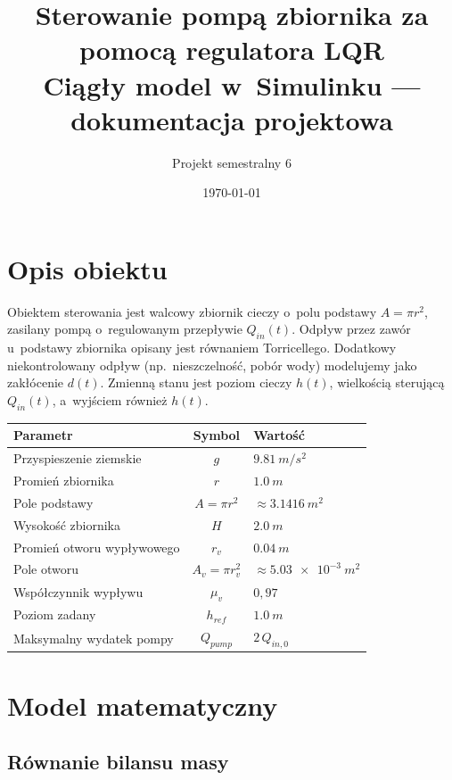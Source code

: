 \documentclass[11pt,a4paper]{article}
\title{\textbf{Sterowanie pompą zbiornika za pomocą regulatora LQR}\\
       \large Ciągły model w~Simulinku --- dokumentacja projektowa}
\author{Projekt semestralny 6}
\date{\today}
\begin{document}
\maketitle

\section{Opis obiektu}

Obiektem sterowania jest walcowy zbiornik cieczy o~polu podstawy
$A = \pi r^2$, zasilany pompą o~regulowanym przepływie $Q_{in}(t)$.
Odpływ przez zawór u~podstawy zbiornika opisany jest równaniem Torricellego.
Dodatkowy niekontrolowany odpływ (np.\ nieszczelność, pobór wody) modelujemy
jako zakłócenie $d(t)$. Zmienną stanu jest poziom cieczy $h(t)$, wielkością
sterującą $Q_{in}(t)$, a~wyjściem również $h(t)$.

\begin{center}
\begin{tabular}{@{}lcl@{}}
\toprule
Parametr & Symbol & Wartość \\
\midrule
Przyspieszenie ziemskie   & $g$      & $\SI{9.81}{m/s^2}$ \\
Promień zbiornika         & $r$      & $\SI{1.0}{m}$ \\
Pole podstawy             & $A=\pi r^2$ & $\approx \SI{3.1416}{m^2}$ \\
Wysokość zbiornika        & $H$      & $\SI{2.0}{m}$ \\
Promień otworu wypływowego& $r_v$    & $\SI{0.04}{m}$ \\
Pole otworu               & $A_v=\pi r_v^2$ & $\approx \SI{5.03e-3}{m^2}$ \\
Współczynnik wypływu      & $\mu_v$  & $0{,}97$ \\
Poziom zadany             & $h_{ref}$& $\SI{1.0}{m}$ \\
Maksymalny wydatek pompy  & $Q_{pump}$ & $2\,Q_{in,0}$ \\
\bottomrule
\end{tabular}
\end{center}

\section{Model matematyczny}

\subsection{Równanie bilansu masy}
\end{document}
